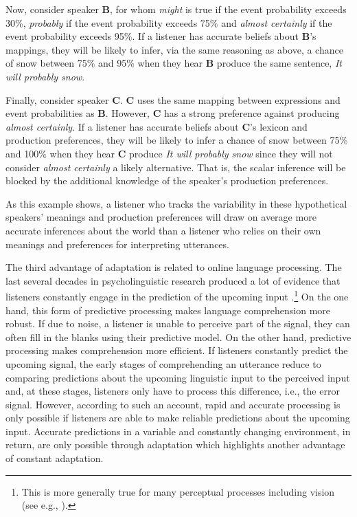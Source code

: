 Now, consider speaker {\bf B}, for whom \textit{might} is true if the event probability exceeds 30\%, 
\textit{probably} if the event probability exceeds 75\% and \textit{almost certainly}  if the event probability exceeds 95\%. If a listener has
accurate beliefs about {\bf B}'s mappings, they will be likely to infer, via the same reasoning as above, a chance of snow between 75\% and 95\% when they hear {\bf B} produce the same sentence, \textit{It will probably snow}.

Finally, consider speaker {\bf C}. {\bf C} uses the same mapping between expressions and event probabilities as {\bf B}. However, {\bf C} has a strong preference against 
producing \textit{almost certainly}. If a listener has accurate beliefs about {\bf C}'s lexicon and production preferences, 
they will be likely to infer a chance of snow between 75\% and 100\% when they hear {\bf C} produce \textit{It will probably snow} since they will not
consider  \textit{almost certainly} a likely alternative. That is, the scalar inference will be blocked by the additional knowledge of the speaker's production preferences. 

As this example shows, a listener who tracks the variability in these hypothetical speakers' meanings and production preferences 
will draw on average more accurate inferences about the world than a listener who relies on their own meanings and preferences
for interpreting utterances.

The third advantage of adaptation is related to online language processing. The last several decades
in psycholinguistic research produced a lot of evidence that listeners constantly engage in the prediction of 
the upcoming input \cite{e.g.KuperbergJaeger2016}.\footnote{This is more generally true for many perceptual 
processes including vision (see e.g., \cite{Clark2013; Friston2010}).} 
On the one hand, this form of predictive processing makes language comprehension more robust. If due to noise,
a listener is unable to perceive part of the signal, they can often fill in the blanks using their predictive model.
On the other hand, predictive processing makes comprehension more efficient. 
If listeners constantly predict the upcoming signal, the early stages of comprehending an utterance 
reduce to comparing predictions about the upcoming linguistic input to the perceived input and, at these stages, 
listeners only have to process this difference, i.e., the error signal. However, according to such an account,
rapid and accurate processing is only possible if listeners are able to make reliable predictions about the upcoming
input. Accurate predictions in a variable and constantly changing environment, in return, are only possible through
 adaptation which highlights another advantage of constant adaptation.

